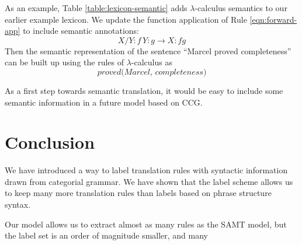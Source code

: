 \documentclass[a4paper]{article}
\newcommand\anonymize[1]{}
\begin{document}
As an example, Table \ref{table:lexicon-semantic} adds $\lambda$-calculus semantics to our earlier example lexicon. We update the function application of Rule \ref{eqn:forward-app} to include semantic annotations:
\begin{equation}
X/Y:f \, Y:g \to X:fg
\end{equation}
Then the semantic representation of the sentence ``Marcel proved completeness'' can be built up using the rules of $\lambda$-calculus as
\begin{equation}
\textit{proved(Marcel, completeness)}
\end{equation}

As a first step towards semantic translation, it would be easy to include some semantic information in a future model based on CCG. 

\section{Conclusion}

We have introduced a way to label translation rules with syntactic information drawn from categorial grammar. We have shown that the label scheme allows us to keep many more translation rules than labels based on phrase structure syntax.

Our model allows us to extract almost as many rules as the SAMT model, but the label set is an order of magnitude smaller, and many

\anonymize{
\section{Acknowledgements*}
Michael Auli, ???, funding sources
}



\end{document}

